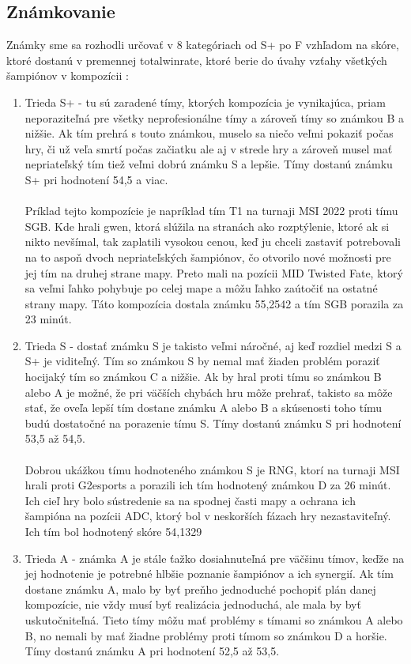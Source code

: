\subsection{Známkovanie}
Známky sme sa rozhodli určovať v 8 kategóriach od S+ po F vzhľadom na skóre, ktoré dostanú v premennej totalwinrate, ktoré berie do úvahy vzťahy všetkých šampiónov v kompozícii :  
\begin{enumerate}
	\item Trieda S+ - tu sú zaradené tímy, ktorých kompozícia je vynikajúca, priam neporaziteľná pre všetky neprofesionálne tímy a zároveň tímy so známkou B a nižšie. Ak tím prehrá s touto známkou, muselo sa niečo veľmi pokaziť počas hry, či už veľa smrtí počas začiatku ale aj v strede hry a zároveň musel mať nepriateľský tím tiež veľmi dobrú známku S a lepšie. Tímy dostanú známku S+ pri hodnotení 54,5 a viac. 
	\\ \\ Príklad tejto kompozície je napríklad tím T1 na turnaji MSI 2022 proti tímu SGB. Kde hrali gwen, ktorá slúžila na stranách ako rozptýlenie, ktoré ak si nikto nevšímal, tak zaplatili vysokou cenou, keď ju chceli zastaviť potrebovali na to aspoň dvoch nepriateľských šampiónov, čo otvorilo nové možnosti pre jej tím na druhej strane mapy. Preto mali na pozícii MID Twisted Fate, ktorý sa veľmi ľahko pohybuje po celej mape a môžu ľahko zaútočiť na ostatné strany mapy. Táto kompozícia dostala známku 55,2542 a tím SGB porazila za 23 minút.
	\\
	\item Trieda S  - dostať známku S je takisto veľmi náročné, aj keď rozdiel medzi S a S+ je viditeľný. Tím so známkou S by nemal mať žiaden problém poraziť hocijaký tím so známkou C a nižšie. Ak by hral proti tímu so známkou B alebo A je možné, že pri väčších chybách hru môže prehrať, takisto sa môže stať, že oveľa lepší tím dostane známku A alebo B a skúsenosti toho tímu budú dostatočné na porazenie tímu S. Tímy dostanú známku S pri hodnotení 53,5 až 54,5.
	\\ \\Dobrou ukážkou tímu hodnoteného známkou S je RNG, ktorí na turnaji MSI hrali proti G2esports a porazili ich tím hodnotený známkou D za 26 minút. Ich cieľ hry bolo sústredenie sa na spodnej časti mapy a ochrana ich šampióna na pozícii ADC, ktorý bol v neskorších fázach hry nezastaviteľný. Ich tím bol hodnotený skóre 54,1329
	\\
	\item Trieda A  - známka A je stále ťažko dosiahnuteľná pre väčšinu tímov, keďže na jej hodnotenie je potrebné hlbšie poznanie šampiónov a ich synergií. Ak tím dostane známku A, malo by byť preňho jednoduché pochopiť plán danej kompozície, nie vždy musí byť realizácia jednoduchá, ale mala by byť uskutočniteľná. Tieto tímy môžu mať problémy s tímami so známkou A alebo B, no nemali by mať žiadne problémy proti tímom so známkou D a horšie. Tímy dostanú známku A pri hodnotení 52,5 až 53,5.

\end{enumerate}
